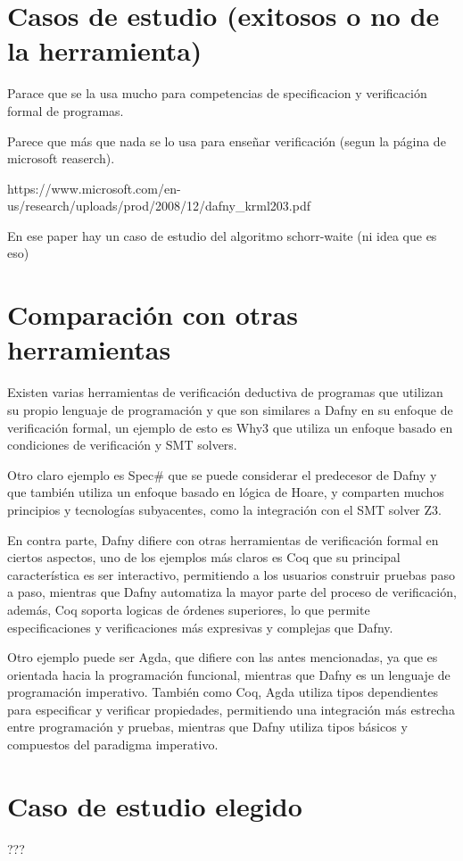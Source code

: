 \documentclass[runningheads]{llncs}
\begin{document}
\section{Casos de estudio (exitosos o no de la herramienta)}
Parace que se la usa mucho para competencias de specificacion y verificación formal de programas.

Parece que más que nada se lo usa para enseñar verificación (segun la página de microsoft reaserch).

https://www.microsoft.com/en-us/research/uploads/prod/2008/12/dafny\_krml203.pdf

En ese paper hay un caso de estudio del algoritmo schorr-waite (ni idea que es eso)

\section{Comparación con otras herramientas}

Existen varias herramientas de verificación deductiva de programas que utilizan su propio lenguaje de programación 
y que son similares a Dafny en su enfoque de verificación formal, 
un ejemplo de esto es Why3 que utiliza un enfoque basado en condiciones de verificación y SMT solvers.

Otro claro ejemplo es Spec\# que se puede considerar el predecesor de Dafny y que también utiliza un enfoque basado en lógica de Hoare,
y comparten muchos principios y tecnologías subyacentes, como la integración con el SMT solver Z3.

En contra parte, Dafny difiere con otras herramientas de verificación formal en ciertos aspectos, uno de los ejemplos más claros es Coq 
que su principal característica es ser interactivo, 
permitiendo a los usuarios construir pruebas paso a paso, mientras que Dafny automatiza la mayor parte del proceso de verificación,
además, Coq soporta logicas de órdenes superiores, lo que permite especificaciones y verificaciones más expresivas y complejas que Dafny.

Otro ejemplo puede ser Agda, que difiere con las antes mencionadas, ya que 
es orientada hacia la programación funcional, mientras que Dafny es un lenguaje de programación imperativo. 
También como Coq, Agda utiliza tipos dependientes para especificar y verificar propiedades, 
permitiendo una integración más estrecha entre programación y pruebas, mientras que Dafny utiliza tipos básicos y compuestos del paradigma imperativo.

\section{Caso de estudio elegido}
???
\end{document}
